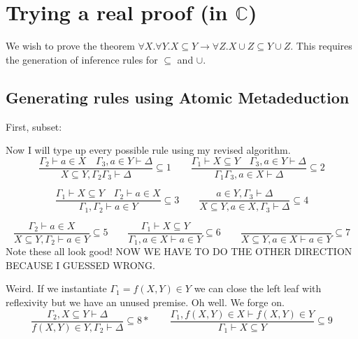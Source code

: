 \documentclass[12pt]{article}
\begin{document}
\section{Trying a real proof (in $\mathbb{C}$)}

We wish to prove the theorem $\forall X.\forall Y.X\subseteq Y\rightarrow \forall Z.X\cup Z\subseteq
Y\cup Z$. This requires the generation of inference rules for $\subseteq$ and
$\cup$.

\subsection{Generating rules using Atomic Metadeduction}
First, subset:
\begin{prooftree}
\end{prooftree}
Now I will type up every possible rule using my revised algorithm.
\[
\frac{\Gamma_2\vdash a\in X\quad\Gamma_3,a\in Y\vdash\Delta}
     {X\subseteq Y,\Gamma_2\Gamma_3\vdash\Delta}\subseteq 1
\quad\quad
\frac{\Gamma_1\vdash X\subseteq Y\quad\Gamma_3,a\in Y\vdash\Delta}
     {\Gamma_1\Gamma_3,a\in X\vdash\Delta}\subseteq 2
\]

\[
\frac{\Gamma_1\vdash X\subseteq Y\quad\Gamma_2\vdash a\in X}
     {\Gamma_1,\Gamma_2\vdash a\in Y}\subseteq 3
\quad\quad
\frac{a\in Y,\Gamma_3\vdash\Delta}
     {X\subseteq Y,a\in X,\Gamma_3\vdash\Delta}\subseteq 4
\]

\[
\frac{\Gamma_2\vdash a\in X}
     {X\subseteq Y,\Gamma_2\vdash a\in Y}\subseteq 5
\quad\quad
\frac{\Gamma_1\vdash X\subseteq Y}
     {\Gamma_1,a\in X\vdash a\in Y}\subseteq 6
\quad\quad
\frac{}{X\subseteq Y,a\in X\vdash a\in Y}\subseteq 7
\]
Note these all look good! NOW WE HAVE TO DO THE OTHER DIRECTION BECAUSE I
GUESSED WRONG.
\begin{prooftree}
\end{prooftree}
Weird. If we instantiate $\Gamma_1=f(X,Y)\in Y$ we can close the left leaf with
reflexivity but we have an unused premise. Oh well. We forge on.
\[
    \frac{\Gamma_2,X\subseteq Y\vdash\Delta}{f(X,Y)\in
    Y,\Gamma_2\vdash\Delta}\subseteq 8*
    \quad\quad
    \frac{\Gamma_1,f(X,Y)\in X\vdash f(X,Y)\in Y}{\Gamma_1\vdash X\subseteq
    Y}\subseteq 9
\]
\end{document}
